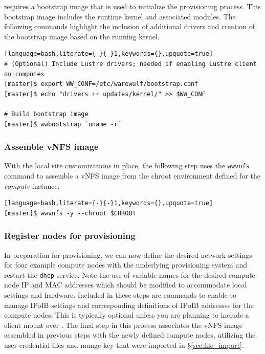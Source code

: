 \documentclass[letterpaper]{article}
\begin{document}
\Warewulf{} requires a bootstrap image that is used to initialize the provisioning
process. This bootstrap image includes the runtime kernel and associated
modules. The following commands highlight the inclusion of additional drivers
and creation of the bootstrap image based on the running kernel.

\begin{lstlisting}[language=bash,literate={-}{-}1,keywords={},upquote=true]
# (Optional) Include Lustre drivers; needed if enabling Lustre client on computes
[master]$ export WW_CONF=/etc/warewulf/bootstrap.conf
[master]$ echo "drivers += updates/kernel/" >> $WW_CONF

# Build bootstrap image
[master]$ wwbootstrap `uname -r`
\end{lstlisting}

\subsubsection{Assemble vNFS image}

With the local site customizations in place, the following step uses the
\texttt{wwvnfs} command to assemble a vNFS image from the chroot environment
defined for the {\em compute} instance. 

\begin{lstlisting}[language=bash,literate={-}{-}1,keywords={},upquote=true]
[master]$ wwvnfs -y --chroot $CHROOT
\end{lstlisting}

\subsubsection{Register nodes for provisioning}

In preparation for provisioning, we can now define the desired network settings
for four example compute nodes with the underlying provisioning system and
restart the \texttt{dhcp} service. Note the use of variable names for the
desired compute node IP and MAC addresses which should be modified to
accommodate local settings and hardware. Included in these steps are commands
to enable \Warewulf{} to manage IPoIB settings and corresponding definitions of
IPoIB addresses for the compute nodes. This is typically optional unless you
are planning to include a \Lustre{} client mount over \InfiniBand{}.  The final step
in this process associates the vNFS image assembled in previous steps with the
newly defined compute nodes, utilizing the user credential files and munge key
that were imported in \S\ref{sec:file_import}.
\end{document}
